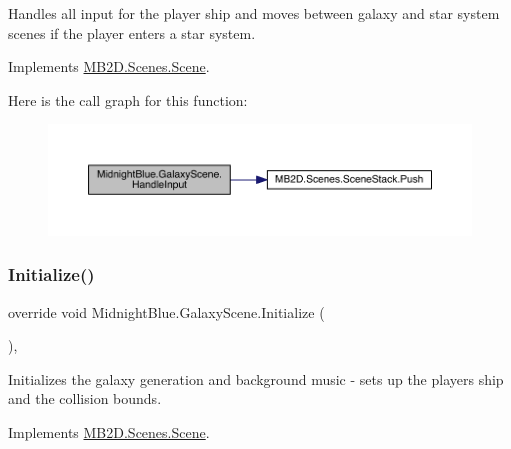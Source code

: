 Handles all input for the player ship and moves between galaxy and star system scenes if the player enters a star system. 



Implements \hyperlink{class_m_b2_d_1_1_scenes_1_1_scene_a476de5a885408d27ff151044d20738c8}{M\+B2\+D.\+Scenes.\+Scene}.

Here is the call graph for this function\+:
\nopagebreak
\begin{figure}[H]
\begin{center}
\leavevmode
\includegraphics[width=350pt]{class_midnight_blue_1_1_galaxy_scene_afd7f8c9f6d0cf6ded10299d4b0015c29_cgraph}
\end{center}
\end{figure}
\hypertarget{class_midnight_blue_1_1_galaxy_scene_a97d97e56a73d9a4b7caf6dd6ce86647e}{}\label{class_midnight_blue_1_1_galaxy_scene_a97d97e56a73d9a4b7caf6dd6ce86647e} 
\subsubsection{\texorpdfstring{Initialize()}{Initialize()}}
{\footnotesize\ttfamily override void Midnight\+Blue.\+Galaxy\+Scene.\+Initialize (\begin{DoxyParamCaption}{ }\end{DoxyParamCaption})\hspace{0.3cm}{\ttfamily [inline]}, {\ttfamily [virtual]}}



Initializes the galaxy generation and background music -\/ sets up the players ship and the collision bounds. 



Implements \hyperlink{class_m_b2_d_1_1_scenes_1_1_scene_a081b4f8866936b495bdce388a7c96c25}{M\+B2\+D.\+Scenes.\+Scene}.

\hypertarget{class_midnight_blue_1_1_galaxy_scene_aeb44afaeda2cccd225e64908bb76bee4}{}\label{class_midnight_blue_1_1_galaxy_scene_aeb44afaeda2cccd225e64908bb76bee4} 
